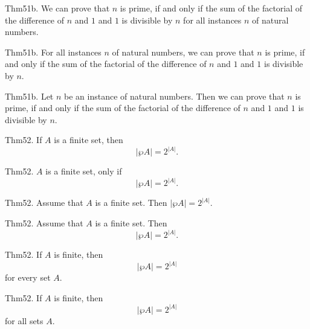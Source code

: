 \documentclass{article}
\begin{document}
Thm51b. We can prove that $n$ is prime, if and only if the sum of the factorial of the difference of $n$ and $1$ and $1$ is divisible by $n$ for all instances $n$ of natural numbers.

Thm51b. For all instances $n$ of natural numbers, we can prove that $n$ is prime, if and only if the sum of the factorial of the difference of $n$ and $1$ and $1$ is divisible by $n$.

Thm51b. Let $n$ be an instance of natural numbers. Then we can prove that $n$ is prime, if and only if the sum of the factorial of the difference of $n$ and $1$ and $1$ is divisible by $n$.

Thm52. If $A$ is a finite set, then $$| \wp A | = 2 ^ {| A |}.$$

Thm52. $A$ is a finite set, only if $$| \wp A | = 2 ^ {| A |}.$$

Thm52. Assume that $A$ is a finite set. Then $| \wp A | = 2 ^ {| A |}$.

Thm52. Assume that $A$ is a finite set. Then $$| \wp A | = 2 ^ {| A |}.$$

Thm52. If $A$ is finite, then $$| \wp A | = 2 ^ {| A |}$$ for every set $A$.

Thm52. If $A$ is finite, then $$| \wp A | = 2 ^ {| A |}$$ for all sets $A$.
\end{document}
